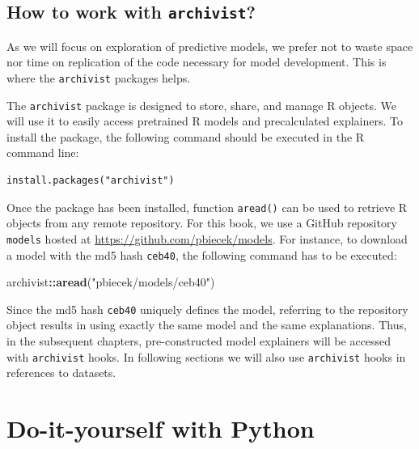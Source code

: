 \documentclass[]{krantz}
\newenvironment{Shaded}{\begin{snugshade}}{\end{snugshade}}
\newcommand{\KeywordTok}[1]{\textcolor[rgb]{0.13,0.29,0.53}{\textbf{#1}}}
\newcommand{\NormalTok}[1]{#1}
\newcommand{\OperatorTok}[1]{\textcolor[rgb]{0.81,0.36,0.00}{\textbf{#1}}}
\newcommand{\StringTok}[1]{\textcolor[rgb]{0.31,0.60,0.02}{#1}}
\begin{document}
\hypertarget{how-to-work-with-archivist}{%
\section{\texorpdfstring{How to work with \texttt{archivist}?}{How to work with archivist?}}\label{how-to-work-with-archivist}}

As we will focus on exploration of predictive models, we prefer not to waste space nor time on replication of the code necessary for model development. This is where the \texttt{archivist} packages helps.

The \texttt{archivist} package \citep{archivist} is designed to store, share, and manage R objects. We will use it to easily access pretrained R models and precalculated explainers. To install the package, the following command should be executed in the R command line:

\begin{verbatim}
install.packages("archivist")
\end{verbatim}

Once the package has been installed, function \texttt{aread()} can be used to retrieve R objects from any remote repository. For this book, we use a GitHub repository \texttt{models} hosted at \url{https://github.com/pbiecek/models}. For instance, to download a model with the md5 hash \texttt{ceb40}, the following command has to be executed:

\begin{Shaded}
\begin{Highlighting}[]
\NormalTok{archivist}\OperatorTok{::}\KeywordTok{aread}\NormalTok{(}\StringTok{"pbiecek/models/ceb40"}\NormalTok{)}
\end{Highlighting}
\end{Shaded}

Since the md5 hash \texttt{ceb40} uniquely defines the model, referring to the repository object results in using exactly the same model and the same explanations. Thus, in the subsequent chapters, pre-constructed model explainers will be accessed with \texttt{archivist} hooks. In following sections we will also use \texttt{archivist} hooks in references to datasets.

\hypertarget{doItYourselfWithPython}{%
\chapter{Do-it-yourself with Python}\label{doItYourselfWithPython}}
\end{document}
